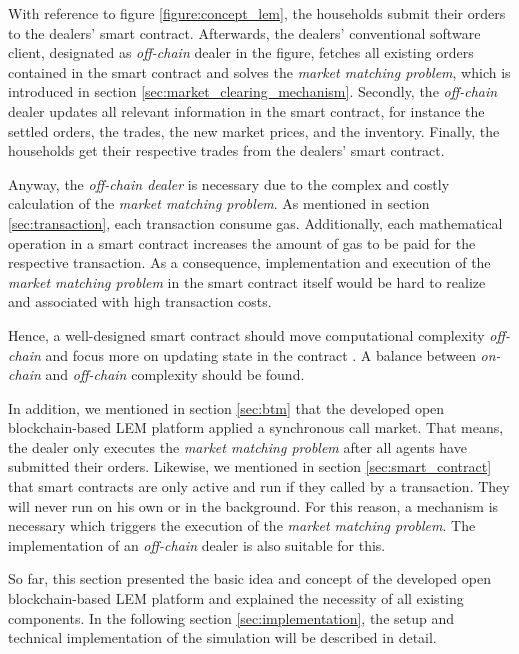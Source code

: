 With reference to figure \ref{figure:concept_lem}, the households submit their orders to the dealers' smart contract. 
Afterwards, the dealers' conventional software client, designated as \textit{off-chain} dealer in the figure, fetches all existing orders contained in the smart contract
and solves the \textit{market matching problem}, which is introduced in section \ref{sec:market_clearing_mechanism}.
Secondly, the \textit{off-chain} dealer updates all relevant information in the smart contract, for instance 
the settled orders, the trades, the new market prices, and the inventory.
Finally, the households get their respective trades from the dealers' smart contract. 

Anyway, the \textit{off-chain dealer} is necessary due to the complex and costly calculation of the \textit{market matching problem}. 
As mentioned in section \ref{sec:transaction}, each transaction consume gas. Additionally, each mathematical operation in a smart contract
increases the amount of gas to be paid for the respective transaction. As a consequence, implementation and execution of the \textit{market matching problem}
in the smart contract itself would be hard to realize and associated with high transaction costs. 

Hence, a well-designed smart contract should move computational complexity \textit{off-chain} 
and focus more on updating state in the contract . A balance between \textit{on-chain}
and \textit{off-chain} complexity should be found.

In addition, we mentioned in section \ref{sec:btm} that the developed open blockchain-based LEM platform applied a synchronous
call market. That means, the dealer only executes the \textit{market matching problem} after all agents have submitted their orders.
Likewise, we mentioned in section \ref{sec:smart_contract} that smart contracts are only active and run if they called by a transaction.
They will never run on his own or in the background. For this reason, a mechanism is necessary which triggers the execution of the 
\textit{market matching problem}. The implementation of an \textit{off-chain} dealer is also suitable for this.

So far, this section presented the basic idea and concept of the developed open blockchain-based LEM platform
and explained the necessity of all existing components. In the following section \ref{sec:implementation}, the setup and technical implementation of the simulation will be described in detail. 

